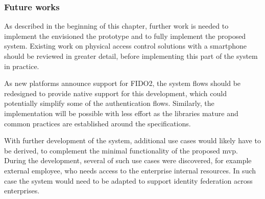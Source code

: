 \subsubsection*{Future works}
As described in the beginning of this chapter, further work is needed to implement the envisioned the prototype and to fully implement the proposed system. Existing work on physical access control solutions with a smartphone should be reviewed in greater detail, before implementing this part of the system in practice. 

As new platforms announce support for FIDO2, the system flows should be redesigned to provide native support for this development, which could potentially simplify some of the authentication flows. Similarly, the implementation will be possible with less effort as the libraries mature and common practices are established around the specifications.

With further development of the system, additional use cases would likely have to be derived, to complement the minimal functionality of the proposed \acrshort{mvp}. During the development, several of such use cases were discovered, for example external employee, who needs access to the enterprise internal resources. In such case the system would need to be adapted to support identity federation across enterprises.